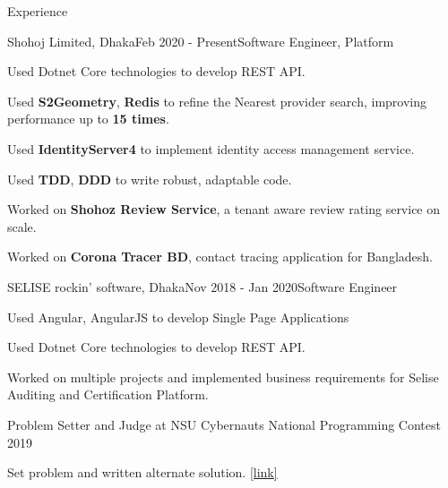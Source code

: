 \documentclass{resume}
\begin{document}
\begin{rSection}{Experience}

\begin{rSubsection}{Shohoj Limited, Dhaka}{Feb 2020 - Present}{Software Engineer, Platform}{}

\item Used Dotnet Core technologies to develop REST API.
\item Used \textbf{S2Geometry}, \textbf{Redis} to refine the Nearest provider search, improving performance  up to \textbf{15 times}.
\item Used \textbf{IdentityServer4} to implement identity access management service.
\item Used \textbf{TDD}, \textbf{DDD} to write robust, adaptable code.
\item Worked on \textbf{Shohoz Review Service}, a tenant aware review rating service on scale.
\item Worked on \textbf{Corona Tracer BD}, contact tracing application for Bangladesh.
\end{rSubsection}

\begin{rSubsection}{SELISE rockin' software, Dhaka}{Nov 2018 - Jan 2020}{Software Engineer}{}
\item Used Angular, AngularJS to develop Single Page Applications
\item Used Dotnet Core technologies to develop REST API.
\item  Worked on multiple projects and implemented business requirements for Selise Auditing and Certification Platform.
\end{rSubsection}

\begin{rSubsection}{Problem Setter and Judge at NSU Cybernauts National Programming Contest 2019}{}{}{}
\item Set problem and written alternate solution. \href{https://toph.co/c/cybernauts19}{[link]}
\end{rSubsection}

\end{rSection}

\end{document}
